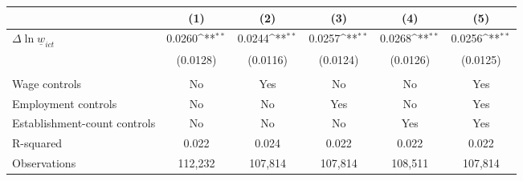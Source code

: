 {
\def\sym#1{\ifmmode^{#1}\else\(^{#1}\)\fi}
\begin{tabular}{l*{5}{c}}
\hline\hline
          &\multicolumn{1}{c}{(1)}         &\multicolumn{1}{c}{(2)}         &\multicolumn{1}{c}{(3)}         &\multicolumn{1}{c}{(4)}         &\multicolumn{1}{c}{(5)}         \\
\hline
$\Delta \ln \underline{w}_{ict}$&   0.0260\sym{**} &   0.0244\sym{**} &   0.0257\sym{**} &   0.0268\sym{**} &   0.0256\sym{**} \\
          & (0.0128)         & (0.0116)         & (0.0124)         & (0.0126)         & (0.0125)         \\
\hline
\vspace{-2mm}&                  &                  &                  &                  &                  \\
Wage controls&       No         &      Yes         &       No         &       No         &      Yes         \\
Employment controls&       No         &       No         &      Yes         &       No         &      Yes         \\
Establishment-count controls&       No         &       No         &       No         &      Yes         &      Yes         \\
R-squared &    0.022         &    0.024         &    0.022         &    0.022         &    0.022         \\
Observations&  112,232         &  107,814         &  107,814         &  108,511         &  107,814         \\
\hline\hline
\end{tabular}
}
